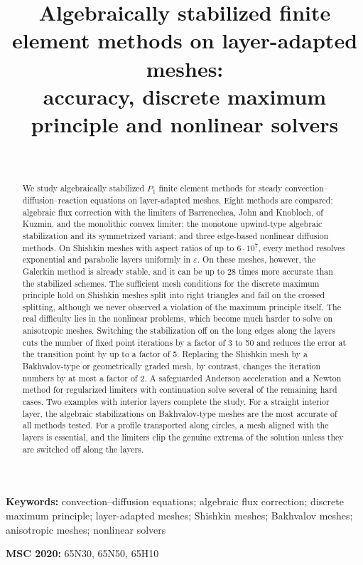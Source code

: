 \documentclass[11pt,a4paper]{article}
\title{Algebraically stabilized finite element methods on layer-adapted meshes:\\
accuracy, discrete maximum principle and nonlinear solvers}
\author{\todo{Author names}\\[1ex]
\small\todo{Affiliations and e-mail addresses}}
\date{}
\newcommand{\eps}{\varepsilon}
\theoremstyle{remark}
\begin{document}
\maketitle

\begin{abstract}
We study algebraically stabilized $P_1$ finite element methods for steady convection--diffusion--reaction equations
on layer-adapted meshes. Eight methods are compared: algebraic flux correction with the limiters of Barrenechea,
John and Knobloch, of Kuzmin, and the monolithic convex limiter; the monotone upwind-type algebraic stabilization and
its symmetrized variant; and three edge-based nonlinear diffusion methods. On Shishkin meshes with aspect ratios of
up to $6\cdot10^7$, every method resolves exponential and parabolic layers uniformly in $\eps$. On these meshes,
however, the Galerkin method is already stable, and it can be up to 28 times more accurate than the stabilized
schemes. The sufficient mesh conditions for the discrete maximum principle hold on Shishkin meshes split into right
triangles and fail on the crossed splitting, although we never observed a violation of the maximum principle
itself. The real difficulty lies in the nonlinear problems, which become much harder to solve on anisotropic meshes.
Switching the stabilization off on the long edges along the layers cuts the number of fixed point iterations by a
factor of 3 to 50 and reduces the error at the transition point by up to a factor of 5. Replacing the Shishkin mesh
by a Bakhvalov-type or geometrically graded mesh, by contrast, changes the iteration numbers by at most a factor of
2. A safeguarded Anderson acceleration and a Newton method for regularized limiters with continuation solve several
of the remaining hard cases. Two examples with interior layers complete the study. For a straight interior layer,
the algebraic stabilizations on Bakhvalov-type meshes are the most accurate of all methods tested. For a profile
transported along circles, a mesh aligned with the layers is essential, and the limiters clip the genuine extrema of
the solution unless they are switched off along the layers.
\end{abstract}

\noindent\textbf{Keywords:} convection--diffusion equations; algebraic flux correction; discrete maximum principle;
layer-adapted meshes; Shishkin meshes; Bakhvalov meshes; anisotropic meshes; nonlinear solvers

\medskip
\noindent\textbf{MSC 2020:} 65N30, 65N50, 65H10
\end{document}
